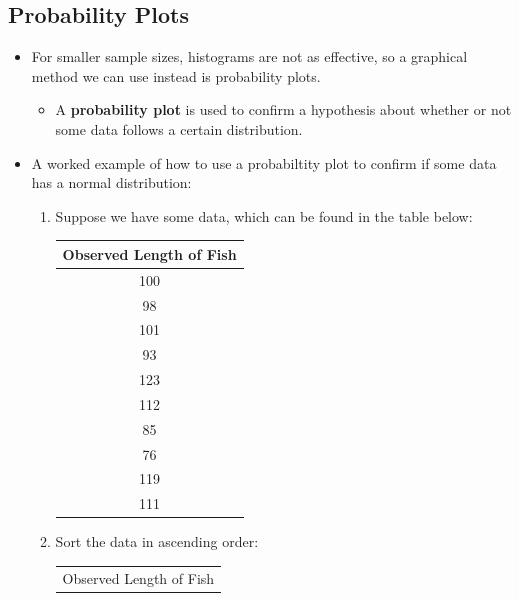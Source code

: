 \documentclass[12pt]{article}
\begin{document}
\subsection{Probability Plots}
\begin{itemize}
	\item For smaller sample sizes, histograms are not as effective, so
	      a graphical method we can use instead is probability plots.
	      \begin{itemize}
		      \item A \textbf{probability plot }is used to confirm a hypothesis about
		            whether or not some data follows a certain distribution.
	      \end{itemize}
	\item A worked example of how to use a probabiltity plot to confirm if some
	      data has a normal distribution:
	      \begin{enumerate}
		      \item Suppose we have some data, which can be found in the table below:
		            \begin{center}
			            \begin{tabular}{c}
				            Observed Length of Fish \\
				            \hline
				            100                     \\
				            98                      \\
				            101                     \\
				            93                      \\
				            123                     \\
				            112                     \\
				            85                      \\
				            76                      \\
				            119                     \\
				            111                     \\
			            \end{tabular}
		            \end{center}
		      \item Sort the data in ascending order:
		            \begin{center}
			            \begin{tabular}{c}
				            Observed Length of Fish \\

\end{tabular}
\end{center}
\end{enumerate}
\end{itemize}
\end{document}
